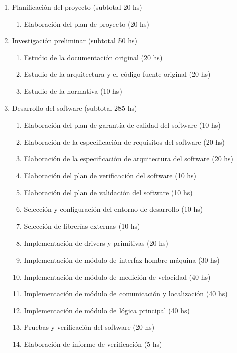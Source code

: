\documentclass[11pt]{charter}
\begin{document}
\begin{enumerate}
\item Planificación del proyecto \hfill (subtotal 20 hs)
  \begin{enumerate}
  \item Elaboración del plan de proyecto \hfill (20 hs)
  \end{enumerate}
\item Investigación preliminar \hfill (subtotal 50 hs)
  \begin{enumerate}
  \item Estudio de la documentación original \hfill (20 hs)
  \item Estudio de la arquitectura y el código fuente original \hfill (20 hs)
  \item Estudio de la normativa \hfill (10 hs)
  \end{enumerate}
\item Desarrollo del software \hfill (subtotal 285 hs)
  \begin{enumerate}
  \item Elaboración del plan de garantía de calidad del software \hfill (10 hs)
  \item Elaboración de la especificación de requisitos del software \hfill (20 hs)
  \item Elaboración de la especificación de arquitectura del software \hfill (20 hs)
  \item Elaboración del plan de verificación del software \hfill (10 hs)
  \item Elaboración del plan de validación del software \hfill (10 hs)
  \item Selección y configuración del entorno de desarrollo \hfill (10 hs)
  \item Selección de librerías externas \hfill (10 hs)
  \item Implementación de drivers y primitivas \hfill (20 hs)
  \item Implementación de módulo de interfaz hombre-máquina \hfill (30 hs)
  \item Implementación de módulo de medición de velocidad \hfill (40 hs)
  \item Implementación de módulo de comunicación y localización \hfill (40 hs)
  \item Implementación de módulo de lógica principal \hfill (40 hs)
  \item Pruebas y verificación del software \hfill (20 hs)
  \item Elaboración de informe de verificación \hfill (5 hs)

\end{enumerate}
\end{enumerate}
\end{document}
